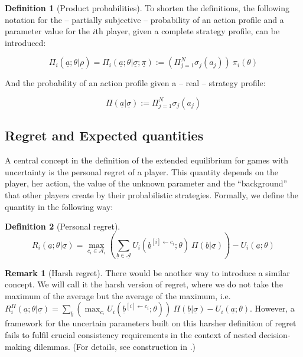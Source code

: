 \documentclass{article}
\theoremstyle{definition}
\newtheorem{definition}{Definition}[section]
\newtheorem*{remark}{Remark}
\begin{document}
\begin{definition}[Product probabilities]
To shorten the definitions, the following notation for the -- partially subjective -- probability of an action profile and a parameter value for the $i$th player, given a complete strategy profile, can be introduced: 

    \begin{equation}
        \Pi_i(\underline{a};\theta | \underline{\rho}) =
        \Pi_i(\underline{a};\theta | \underline{\sigma};\underline{\pi}) := 
        \left ( \Pi_{j=1}^N \sigma_j(a_j) \right ) \ \pi_i(\theta)
    \end{equation}

And the probability of an action profile given a -- real -- strategy profile:

    \begin{equation}
        \Pi(\underline{a}|\underline{\sigma}) := \Pi_{j=1}^N \sigma_j(a_j)
    \end{equation}

    
\end{definition}

\subsection{Regret and Expected quantities}

A central concept in the definition of the extended equilibrium for games with uncertainty is the personal regret of a player. This quantity depends on the player, her action, the value of the unknown parameter and the ``background'' that other players create by their probabilistic strategies.
Formally, we define the quantity in the following way:

\begin{definition}[Personal regret]

\begin{equation}
    R_i(\underline{a};\theta | \underline{\sigma}) = 
    \max_{c_i \in \mathcal{A}_i} 
    \left ( 
    \sum_{\underline{b} \in \underline{\mathcal{A}}} U_i(\underline{b}^{[i] \leftarrow c_i};\theta) \ \Pi(\underline{b}|\underline{\sigma})
    \right )
    -U_i(\underline{a};\theta)
\end{equation}

\end{definition}

\begin{remark}[Harsh regret]
There would be another way to introduce a similar concept. We will call it the harsh version of regret, where we do not take the maximum of the average but the average of the maximum, i.e. 
$R^H_i(\underline{a};\theta | \underline{\sigma}) = 
    \sum_{\underline{b}}
    \left ( 
    \max_{c_i} 
     U_i(\underline{b}^{[i] \leftarrow c_i};\theta) 
    \right )
    \ \Pi(\underline{b}|\underline{\sigma})
    -U_i(\underline{a};\theta)$.
However, a framework for the uncertain parameters built on this harsher definition of regret fails to fulfil crucial consistency requirements in the context of nested decision-making dilemmas. (For details, see construction in \cite{essay:EssayOnUncertaintyKonczer2024}.)

\end{remark}
\end{document}
